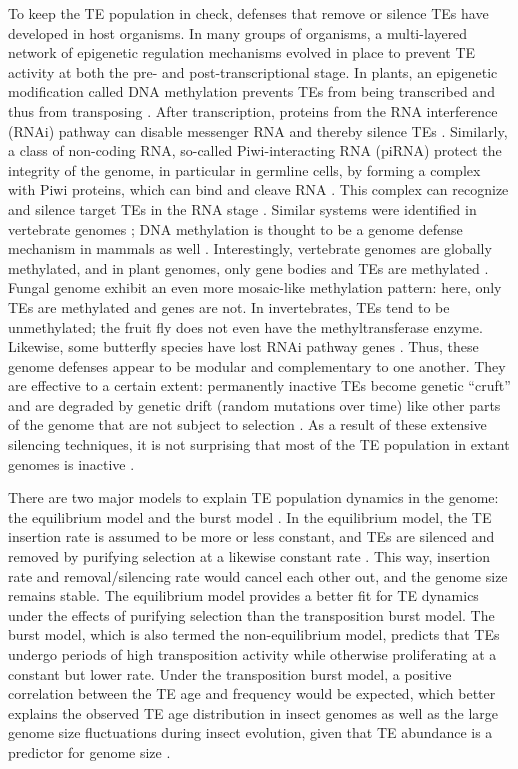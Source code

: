 To keep the TE population in check, defenses that remove or silence TEs
have developed in host organisms. In many groups of organisms, a
multi-layered network of epigenetic regulation mechanisms evolved in
place to prevent TE activity at both the pre- and post-transcriptional
stage. In plants, an epigenetic modification called DNA methylation
prevents TEs from being transcribed and thus from transposing
\citep{Slotkin2007, Lisch2009}. After transcription, proteins from the
RNA interference (RNAi) pathway can disable messenger RNA and thereby
silence TEs \citep{Buchon2006}. Similarly, a class of non-coding RNA,
so-called Piwi-interacting RNA (piRNA) protect the integrity of the
genome, in particular in germline cells, by forming a complex with Piwi
proteins, which can bind and cleave RNA \citep{Zeng2011}. This complex
can recognize and silence target TEs in the RNA stage \citep{Siomi2011, Mondal2018}.
Similar systems were identified in vertebrate genomes \citep{Suzuki2008,
Schubeler2015}; DNA methylation is thought to be a genome defense
mechanism in mammals as well \citep{Yoder1997}. Interestingly,
vertebrate genomes are globally methylated, and in plant genomes, only
gene bodies and TEs are methylated \citep{Suzuki2008}. Fungal genome
exhibit an even more mosaic-like methylation pattern: here, only TEs are
methylated and genes are not. In invertebrates, TEs tend to be
unmethylated; the fruit fly  does not
even have the methyltransferase enzyme. Likewise, some butterfly species
have lost RNAi pathway genes \citep{Pauli2016}. Thus, these genome
defenses appear to be modular and complementary to one another. They are
effective to a certain extent: permanently inactive TEs become genetic
``cruft'' and are degraded by genetic drift (random mutations over time)
like other parts of the genome that are not subject to selection
\citep{Szitenberg2016}. As a result of these extensive silencing
techniques, it is not surprising that most of the TE population in
extant genomes is inactive \citep{Yoder1997, Zilberman2007}.

There are two major models to explain TE population dynamics in the
genome: the equilibrium model and the burst model \citep{Petrov2011,
Kofler2012, Cridland2013, Blumenstiel2014}. In the equilibrium model,
the TE insertion rate is assumed to be more or less constant, and TEs
are silenced and removed by purifying selection at a likewise constant
rate \citep{Charlesworth1983}. This way, insertion rate and
removal/silencing rate would cancel each other out, and the genome size
remains stable.  The equilibrium model provides a better fit for TE
dynamics under the effects of purifying selection \citep{Barron2014}
than the transposition burst model. The burst model, which is also
termed the non-equilibrium model, predicts that TEs undergo periods of
high transposition activity while otherwise proliferating at a constant
but lower rate. Under the transposition burst model, a positive
correlation between the TE age and frequency would be expected, which
better explains the observed TE age distribution in insect genomes as
well as the large genome size fluctuations during insect evolution,
given that TE abundance is a predictor for genome size
\citep{Alfsnes2017, Petersen2018a}.


